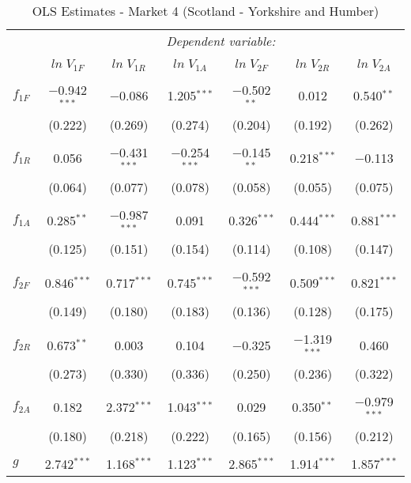 \begin{table}[!htbp] \centering 
  \caption{OLS Estimates - Market 4 (Scotland - Yorkshire and Humber)} 
  \label{} 
\begin{tabular}{@{\extracolsep{5pt}}lcccccc} 
\toprule 
 & \multicolumn{6}{c}{\textit{Dependent variable:}} \\ 
\cline{2-7} 
\\[-1.8ex] & $ln \; V_{1F}$ & $ln \; V_{1R}$ & $ln \; V_{1A}$ & $ln \; V_{2F}$ & $ln \; V_{2R}$ & $ln \; V_{2A}$ \\ 
\hline \\[-1.8ex] 
  $f_{1F}$  & $-$0.942$^{***}$ & $-$0.086 & 1.205$^{***}$ & $-$0.502$^{**}$ & 0.012 & 0.540$^{**}$ \\ 
            & (0.222) & (0.269) & (0.274) & (0.204) & (0.192) & (0.262) \\ 
            & & & & & & \\ 
 $f_{1R}$   & 0.056 & $-$0.431$^{***}$ & $-$0.254$^{***}$ & $-$0.145$^{**}$ & 0.218$^{***}$ & $-$0.113 \\ 
            & (0.064) & (0.077) & (0.078) & (0.058) & (0.055) & (0.075) \\ 
            & & & & & & \\ 
 $f_{1A}$   & 0.285$^{**}$ & $-$0.987$^{***}$ & 0.091 & 0.326$^{***}$ & 0.444$^{***}$ & 0.881$^{***}$ \\ 
            & (0.125) & (0.151) & (0.154) & (0.114) & (0.108) & (0.147) \\ 
            & & & & & & \\ 
 $f_{2F}$   & 0.846$^{***}$ & 0.717$^{***}$ & 0.745$^{***}$ & $-$0.592$^{***}$ & 0.509$^{***}$ & 0.821$^{***}$ \\ 
            & (0.149) & (0.180) & (0.183) & (0.136) & (0.128) & (0.175) \\ 
            & & & & & & \\ 
 $f_{2R}$   & 0.673$^{**}$ & 0.003 & 0.104 & $-$0.325 & $-$1.319$^{***}$ & 0.460 \\ 
            & (0.273) & (0.330) & (0.336) & (0.250) & (0.236) & (0.322) \\ 
            & & & & & & \\ 
 $f_{2A}$   & 0.182 & 2.372$^{***}$ & 1.043$^{***}$ & 0.029 & 0.350$^{**}$ & $-$0.979$^{***}$ \\ 
            & (0.180) & (0.218) & (0.222) & (0.165) & (0.156) & (0.212) \\ 
            & & & & & & \\ 
 $g$        & 2.742$^{***}$ & 1.168$^{***}$ & 1.123$^{***}$ & 2.865$^{***}$ & 1.914$^{***}$ & 1.857$^{***}$ \\ 

\end{tabular}
\end{table}

